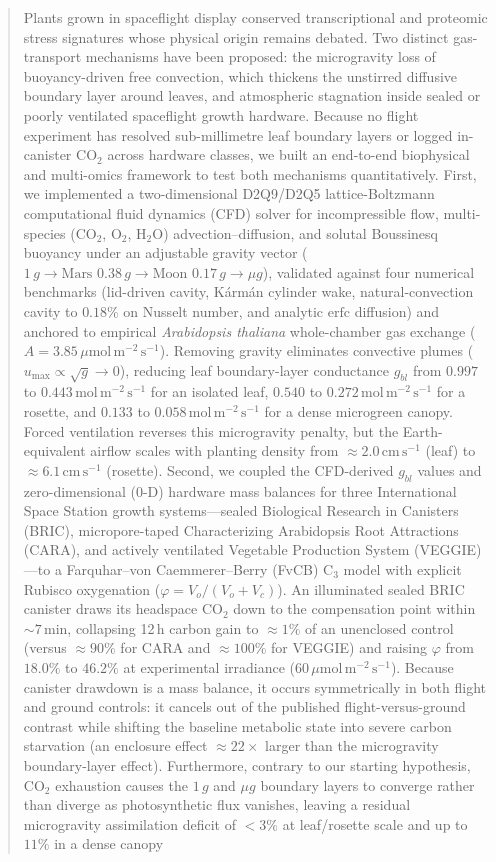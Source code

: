 \documentclass[final,5p,times,twocolumn,numbers,sort&compress]{elsarticle}
\newcommand{\ums}{\ensuremath{\mu\mathrm{mol\,m^{-2}\,s^{-1}}}}
\newcommand{\cmsu}{\ensuremath{\mathrm{cm\,s^{-1}}}}
\newcommand{\molms}{\ensuremath{\mathrm{mol\,m^{-2}\,s^{-1}}}}
\begin{document}
\begin{frontmatter}
\begin{abstract}
Plants grown in spaceflight display conserved transcriptional and proteomic stress signatures whose physical origin remains debated. Two distinct gas-transport mechanisms have been proposed: the microgravity loss of buoyancy-driven free convection, which thickens the unstirred diffusive boundary layer around leaves, and atmospheric stagnation inside sealed or poorly ventilated spaceflight growth hardware. Because no flight experiment has resolved sub-millimetre leaf boundary layers or logged in-canister $\mathrm{CO_2}$ across hardware classes, we built an end-to-end biophysical and multi-omics framework to test both mechanisms quantitatively. First, we implemented a two-dimensional D2Q9/D2Q5 lattice-Boltzmann computational fluid dynamics (CFD) solver for incompressible flow, multi-species ($\mathrm{CO_2}$, $\mathrm{O_2}$, $\mathrm{H_2O}$) advection--diffusion, and solutal Boussinesq buoyancy under an adjustable gravity vector ($1\,g \to \text{Mars } 0.38\,g \to \text{Moon } 0.17\,g \to \mu g$), validated against four numerical benchmarks (lid-driven cavity, K\'arm\'an cylinder wake, natural-convection cavity to $0.18\%$ on Nusselt number, and analytic $\mathrm{erfc}$ diffusion) and anchored to empirical \textit{Arabidopsis thaliana} whole-chamber gas exchange ($A = 3.85\,\ums$). Removing gravity eliminates convective plumes ($u_{\max}\propto\sqrt{g}\to 0$), reducing leaf boundary-layer conductance $g_{bl}$ from $0.997$ to $0.443\,\molms$ for an isolated leaf, $0.540$ to $0.272\,\molms$ for a rosette, and $0.133$ to $0.058\,\molms$ for a dense microgreen canopy. Forced ventilation reverses this microgravity penalty, but the Earth-equivalent airflow scales with planting density from $\approx 2.0\,\cmsu$ (leaf) to $\approx 6.1\,\cmsu$ (rosette). Second, we coupled the CFD-derived $g_{bl}$ values and zero-dimensional (0-D) hardware mass balances for three International Space Station growth systems---sealed Biological Research in Canisters (BRIC), micropore-taped Characterizing Arabidopsis Root Attractions (CARA), and actively ventilated Vegetable Production System (VEGGIE)---to a Farquhar--von Caemmerer--Berry (FvCB) $\mathrm{C_3}$ model with explicit Rubisco oxygenation ($\varphi = V_o/(V_o+V_c)$). An illuminated sealed BRIC canister draws its headspace $\mathrm{CO_2}$ down to the compensation point within $\sim 7\,\mathrm{min}$, collapsing 12\,h carbon gain to $\approx 1\%$ of an unenclosed control (versus $\approx 90\%$ for CARA and $\approx 100\%$ for VEGGIE) and raising $\varphi$ from $18.0\%$ to $46.2\%$ at experimental irradiance ($60\,\ums$). Because canister drawdown is a mass balance, it occurs symmetrically in both flight and ground controls: it cancels out of the published flight-versus-ground contrast while shifting the baseline metabolic state into severe carbon starvation (an enclosure effect $\approx 22\times$ larger than the microgravity boundary-layer effect). Furthermore, contrary to our starting hypothesis, $\mathrm{CO_2}$ exhaustion causes the $1\,g$ and $\mu g$ boundary layers to converge rather than diverge as photosynthetic flux vanishes, leaving a residual microgravity assimilation deficit of $<3\%$ at leaf/rosette scale and up to $11\%$ in a dense canopy 
\end{abstract}
\end{frontmatter}
\end{document}
